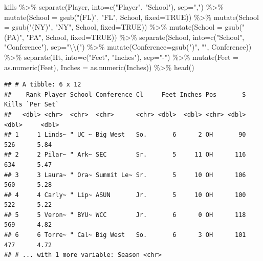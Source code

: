 \documentclass[
]{book}
\newenvironment{Shaded}{\begin{snugshade}}{\end{snugshade}}
\newcommand{\AttributeTok}[1]{\textcolor[rgb]{0.77,0.63,0.00}{#1}}
\newcommand{\ConstantTok}[1]{\textcolor[rgb]{0.00,0.00,0.00}{#1}}
\newcommand{\FunctionTok}[1]{\textcolor[rgb]{0.00,0.00,0.00}{#1}}
\newcommand{\NormalTok}[1]{#1}
\newcommand{\SpecialCharTok}[1]{\textcolor[rgb]{0.00,0.00,0.00}{#1}}
\newcommand{\StringTok}[1]{\textcolor[rgb]{0.31,0.60,0.02}{#1}}
\begin{document}
\begin{Shaded}
\begin{Highlighting}[]
\NormalTok{kills }\SpecialCharTok{\%\textgreater{}\%} 
  \FunctionTok{separate}\NormalTok{(Player, }\AttributeTok{into=}\FunctionTok{c}\NormalTok{(}\StringTok{"Player"}\NormalTok{, }\StringTok{"School"}\NormalTok{), }\AttributeTok{sep=}\StringTok{","}\NormalTok{) }\SpecialCharTok{\%\textgreater{}\%} 
  \FunctionTok{mutate}\NormalTok{(}\AttributeTok{School =} \FunctionTok{gsub}\NormalTok{(}\StringTok{"(FL)"}\NormalTok{, }\StringTok{"FL"}\NormalTok{, School, }\AttributeTok{fixed=}\ConstantTok{TRUE}\NormalTok{)) }\SpecialCharTok{\%\textgreater{}\%}
  \FunctionTok{mutate}\NormalTok{(}\AttributeTok{School =} \FunctionTok{gsub}\NormalTok{(}\StringTok{"(NY)"}\NormalTok{, }\StringTok{"NY"}\NormalTok{, School, }\AttributeTok{fixed=}\ConstantTok{TRUE}\NormalTok{)) }\SpecialCharTok{\%\textgreater{}\%}
  \FunctionTok{mutate}\NormalTok{(}\AttributeTok{School =} \FunctionTok{gsub}\NormalTok{(}\StringTok{"(PA)"}\NormalTok{, }\StringTok{"PA"}\NormalTok{, School, }\AttributeTok{fixed=}\ConstantTok{TRUE}\NormalTok{)) }\SpecialCharTok{\%\textgreater{}\%}
  \FunctionTok{separate}\NormalTok{(School, }\AttributeTok{into=}\FunctionTok{c}\NormalTok{(}\StringTok{"School"}\NormalTok{, }\StringTok{"Conference"}\NormalTok{), }\AttributeTok{sep=}\StringTok{"}\SpecialCharTok{\textbackslash{}\textbackslash{}}\StringTok{("}\NormalTok{) }\SpecialCharTok{\%\textgreater{}\%} 
  \FunctionTok{mutate}\NormalTok{(}\AttributeTok{Conference=}\FunctionTok{gsub}\NormalTok{(}\StringTok{")"}\NormalTok{, }\StringTok{""}\NormalTok{, Conference)) }\SpecialCharTok{\%\textgreater{}\%}
  \FunctionTok{separate}\NormalTok{(Ht, }\AttributeTok{into=}\FunctionTok{c}\NormalTok{(}\StringTok{"Feet"}\NormalTok{, }\StringTok{"Inches"}\NormalTok{), }\AttributeTok{sep=}\StringTok{"{-}"}\NormalTok{) }\SpecialCharTok{\%\textgreater{}\%}
  \FunctionTok{mutate}\NormalTok{(}\AttributeTok{Feet =} \FunctionTok{as.numeric}\NormalTok{(Feet), }\AttributeTok{Inches =} \FunctionTok{as.numeric}\NormalTok{(Inches)) }\SpecialCharTok{\%\textgreater{}\%}
  \FunctionTok{head}\NormalTok{()}
\end{Highlighting}
\end{Shaded}

\begin{verbatim}
## # A tibble: 6 x 12
##    Rank Player School Conference Cl     Feet Inches Pos       S Kills `Per Set`
##   <dbl> <chr>  <chr>  <chr>      <chr> <dbl>  <dbl> <chr> <dbl> <dbl>     <dbl>
## 1     1 Linds~ " UC ~ Big West   So.       6      2 OH       90   526      5.84
## 2     2 Pilar~ " Ark~ SEC        Sr.       5     11 OH      116   634      5.47
## 3     3 Laura~ " Ora~ Summit Le~ Sr.       5     10 OH      106   560      5.28
## 4     4 Carly~ " Lip~ ASUN       Jr.       5     10 OH      100   522      5.22
## 5     5 Veron~ " BYU~ WCC        Jr.       6      0 OH      118   569      4.82
## 6     6 Torre~ " Cal~ Big West   So.       6      3 OH      101   477      4.72
## # ... with 1 more variable: Season <chr>
\end{verbatim}
\end{document}
